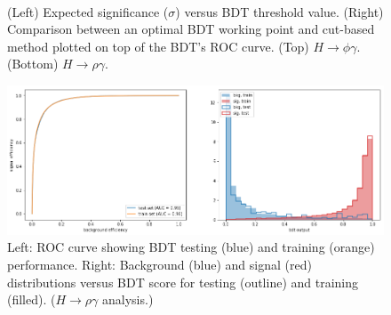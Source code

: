 \begin{figure}[htb]
\begin{center}
\\
\end{center}
\caption{(Left) Expected significance ($\sigma$) versus BDT threshold value. (Right) Comparison between an optimal BDT working point and cut-based method plotted on top of the BDT's ROC curve. (Top) $H\rightarrow\phi\gamma$. (Bottom) $H\rightarrow\rho\gamma$.}
\label{fig:bdt-vs-cuts}
\end{figure}

\begin{figure}[htb]
\begin{center}
\includegraphics[width=.95\linewidth]{Dissertation/fig/bdt-performance_rho.png}
\end{center}
\caption{Left: ROC curve showing BDT testing (blue) and training (orange) performance. Right: Background (blue) and signal (red) distributions versus BDT score for testing (outline) and training (filled). ($H\rightarrow\rho\gamma$ analysis.)}
\label{fig:bdt-performance_rho}
\end{figure}

